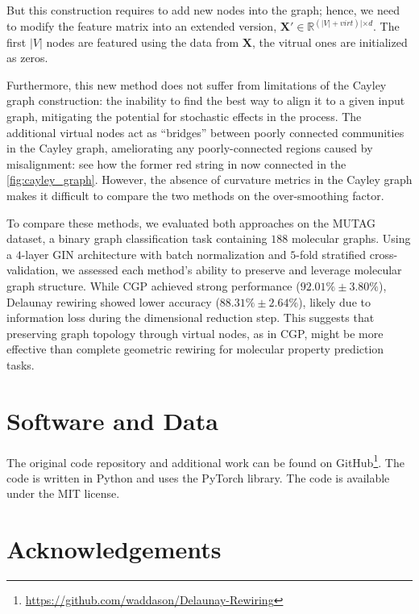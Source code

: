 \documentclass{article}
\theoremstyle{plain}
\theoremstyle{definition}
\theoremstyle{remark}
\begin{document}
But this construction requires to add new nodes into the graph; hence, we need to modify the feature
matrix into an extended version, $\mathbf{X}' \in \mathbb{R}^{(|V| + virt)| \times d}$.
The first $|V|$ nodes are featured using the data from $\mathbf{X}$, the vitrual 
ones are initialized as zeros.


Furthermore, this new method does not suffer from limitations of the Cayley graph construction:
the inability to find the best way to align it to a given input graph, mitigating the potential for
stochastic effects in the process. The additional virtual nodes act as “bridges” between poorly
connected communities in the Cayley graph, ameliorating any poorly-connected regions caused by
misalignment: see how the former red string in now connected in the \cref{fig:cayley_graph}.
However, the absence of curvature metrics in the Cayley graph makes it difficult to compare the two methods
on the over-smoothing factor.


To compare these methods, we evaluated both approaches on the MUTAG dataset, 
a binary graph classification task containing $188$ molecular graphs. Using 
a $4$-layer GIN architecture with batch normalization and $5$-fold stratified 
cross-validation, we assessed each method's ability to preserve and leverage molecular 
graph structure. While CGP achieved strong performance ($92.01\% \pm 3.80\%$), 
Delaunay rewiring showed lower accuracy ($88.31\% \pm 2.64\%$), likely due to 
information loss during the dimensional reduction step. This suggests that preserving 
graph topology through virtual nodes, as in CGP, might be more effective than 
complete geometric rewiring for molecular property prediction tasks.



\section*{Software and Data}

The original code repository and additional work can be found on GitHub\footnote{ 
\url{https://github.com/waddason/Delaunay-Rewiring}}.
The code is written in Python and uses the PyTorch library. The code is available under the MIT license.

\section*{Acknowledgements}
\end{document}
